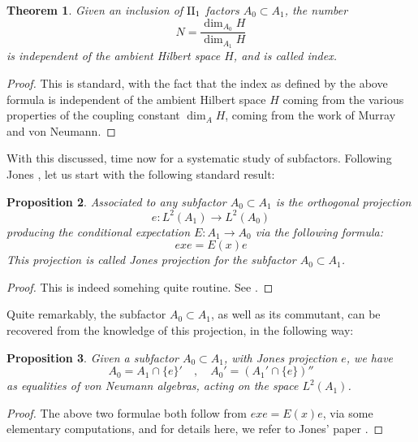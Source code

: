 \documentclass[12pt]{amsbook}
\newtheorem{theorem}{Theorem}[chapter]
\newtheorem{proposition}[theorem]{Proposition}
\begin{document}

\begin{theorem}
Given an inclusion of ${\rm II}_1$ factors $A_0\subset A_1$, the number
$$N=\frac{\dim_{A_0}H}{\dim_{A_1}H}$$
is independent of the ambient Hilbert space $H$, and is called index.
\end{theorem}

\begin{proof}
This is standard, with the fact that the index as defined by the above formula is independent of the ambient Hilbert space $H$ coming from the various properties of the coupling constant $\dim_AH$, coming from the work of Murray and von Neumann.
\end{proof}

With this discussed, time now for a systematic study of subfactors. Following Jones \cite{jo1}, let us start with the following standard result:


\begin{proposition}
Associated to any subfactor $A_0\subset A_1$ is the orthogonal projection
$$e:L^2(A_1)\to L^2(A_0)$$
producing the conditional expectation $E:A_1\to A_0$ via the following formula:
$$exe=E(x)e$$
This projection is called Jones projection for the subfactor $A_0\subset A_1$.
\end{proposition}

\begin{proof}
This is indeed somehing quite routine. See \cite{jo1}.
\end{proof}

Quite remarkably, the subfactor $A_0\subset A_1$, as well as its commutant, can be recovered from the knowledge of this projection, in the following way:

\begin{proposition}
Given a subfactor $A_0\subset A_1$, with Jones projection $e$, we have
$$A_0=A_1\cap\{e\}'\quad,\quad 
A_0'=(A_1'\cap\{e\})''$$
as equalities of von Neumann algebras, acting on the space $L^2(A_1)$.
\end{proposition}

\begin{proof}
The above two formulae both follow from $exe=E(x)e$, via some elementary computations, and for details here, we refer to Jones' paper \cite{jo1}.
\end{proof}
\end{document}
